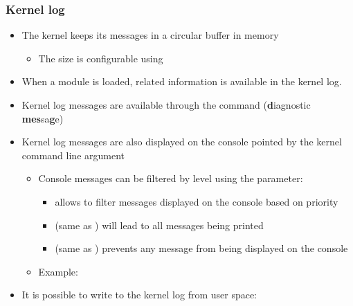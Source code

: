 \begin{frame}
  \frametitle{Kernel log}
  \begin{itemize}
  \item The kernel keeps its messages in a circular buffer in memory
    \begin{itemize}
    \item The size is configurable using 
    \end{itemize}
  \item When a module is loaded, related information is available in the
    kernel log.
  \item Kernel log messages are available through the 
    command ({\bf d}iagnostic {\bf mes}sa{\bf g}e)
  \item Kernel log messages are also displayed on the console pointed by
    the  kernel command line argument
    \begin{itemize}
    \item Console messages can be filtered by level using the
       parameter:
      \begin{itemize}
      \item {} allows to filter messages displayed on the
        console based on priority
      \item {} (same as ) will lead
        to all messages being printed
      \item {} (same as ) prevents any message
        from being displayed on the console
      \end{itemize}
    \item Example: 
    \end{itemize}
  \item It is possible to write to the kernel log from user space:
  \end{itemize}
\end{frame}
